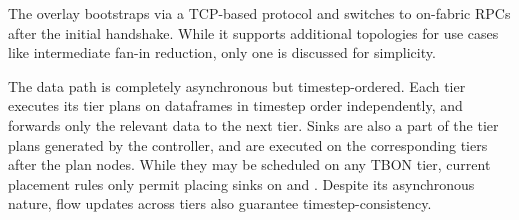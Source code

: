 \enlargethispage{-\baselineskip}

The overlay bootstraps via a TCP-based protocol and switches to on-fabric RPCs after the initial
handshake.
While it supports additional topologies for use cases like intermediate fan-in reduction, only one
is discussed for simplicity.

The data path is completely asynchronous but timestep-ordered.
Each tier executes its tier plans on dataframes in timestep order independently, and forwards
only the relevant data to the next tier.
Sinks are also a part of the tier plans generated by the controller, and are executed
on the corresponding tiers after the plan nodes.
While they may be scheduled on any TBON tier, current placement rules only
permit placing sinks on \tierctl{} and \tieragg{}.
Despite its asynchronous nature, flow updates across tiers also guarantee timestep-consistency.



